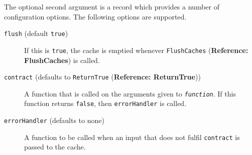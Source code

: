 \documentclass[a4paper,11pt]{report}
\begin{document}
{{{ The optional second argument is a record which provides a number of
configuration options. The following options are supported. 
\begin{description}
\item[{\texttt{flush} (default \texttt{true})}]  If this is \texttt{true}, the cache is emptied whenever \texttt{FlushCaches} (\textbf{Reference: FlushCaches}) is called. 
\item[{\texttt{contract} (defaults to \texttt{ReturnTrue} (\textbf{Reference: ReturnTrue}))}]  A function that is called on the arguments given to \mbox{\texttt{\mdseries\slshape function}}. If this function returns \texttt{false}, then \texttt{errorHandler} is called. 
\item[{\texttt{errorHandler} (defaults to none)}]  A function to be called when an input that does not fulfil \texttt{contract} is passed to the cache. 
\end{description}
 

 }

 }

 }

   
\end{document}
